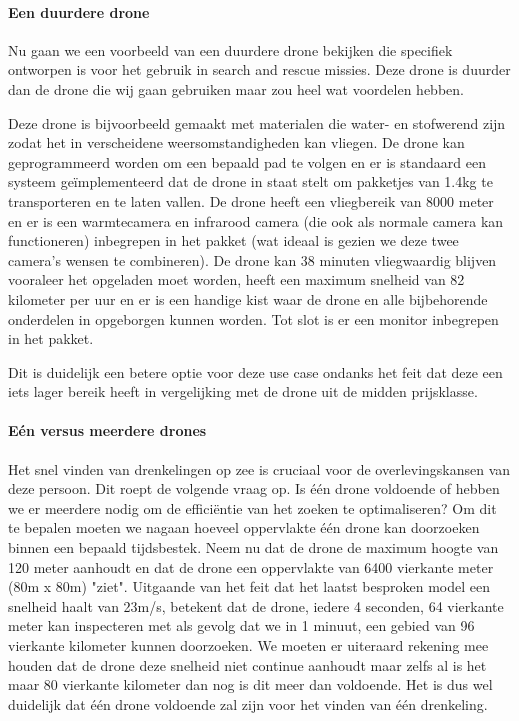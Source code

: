 \paragraph{Een duurdere drone}

Nu gaan we een voorbeeld van een duurdere drone bekijken die specifiek ontworpen is voor het gebruik in search and rescue missies. Deze drone is duurder dan de drone die wij gaan gebruiken maar zou heel wat voordelen hebben. \autocite{Industrial}

Deze drone is bijvoorbeeld gemaakt met materialen die water- en stofwerend zijn zodat het in verscheidene weersomstandigheden kan vliegen. De drone kan geprogrammeerd worden om een bepaald pad te volgen en er is standaard een systeem geïmplementeerd dat de drone in staat stelt om pakketjes van 1.4kg te transporteren en te laten vallen. De drone heeft een vliegbereik van 8000 meter en er is een warmtecamera en infrarood camera (die ook als normale camera kan functioneren) inbegrepen in het pakket (wat ideaal is gezien we deze twee camera's wensen te combineren). De drone kan 38 minuten vliegwaardig blijven vooraleer het opgeladen moet worden, heeft een maximum snelheid van 82 kilometer per uur en er is een handige kist waar de drone en alle bijbehorende onderdelen in opgeborgen kunnen worden. Tot slot is er een monitor inbegrepen in het pakket.

Dit is duidelijk een betere optie voor deze use case ondanks het feit dat deze een iets lager bereik heeft in vergelijking met de drone uit de midden prijsklasse.

\paragraph{Eén versus meerdere drones}

Het snel vinden van drenkelingen op zee is cruciaal voor de overlevingskansen van deze persoon. Dit roept de volgende vraag op. Is één drone voldoende of hebben we er meerdere nodig om de efficiëntie van het zoeken te optimaliseren? Om dit te bepalen moeten we nagaan hoeveel oppervlakte één drone kan doorzoeken binnen een bepaald tijdsbestek. Neem nu dat de drone de maximum hoogte van 120 meter aanhoudt en dat de drone een oppervlakte van 6400 vierkante meter (80m x 80m) "ziet". Uitgaande van het feit dat het laatst besproken model een snelheid haalt van 23m/s, betekent dat de drone, iedere 4 seconden, 64 vierkante meter kan inspecteren met als gevolg dat we in 1 minuut, een gebied van 96 vierkante kilometer kunnen doorzoeken. We moeten er uiteraard rekening mee houden dat de drone deze snelheid niet continue aanhoudt maar zelfs al is het maar 80 vierkante kilometer dan nog is dit meer dan voldoende. Het is dus wel duidelijk dat één drone voldoende zal zijn voor het vinden van één drenkeling.


